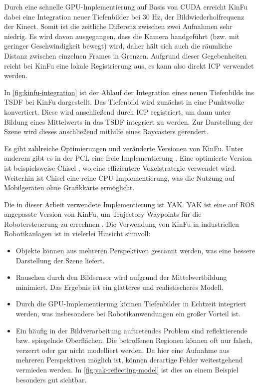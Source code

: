 Durch eine schnelle GPU-Implementierung auf Basis von CUDA erreicht \ac{KinFu} dabei eine Integration neuer Tiefenbilder bei 30 Hz, der Bildwiederholfrequenz der Kinect.
Somit ist die zeitliche Differenz zwischen zwei Aufnahmen sehr niedrig.
Es wird davon ausgegangen, dass die Kamera handgeführt (bzw. mit geringer Geschwindigkeit bewegt) wird, daher hält sich auch die räumliche Distanz zwischen einzelnen Frames in Grenzen.
Aufgrund dieser Gegebenheiten reicht bei \ac{KinFu} eine lokale Registrierung aus, es kann also direkt \ac{ICP} verwendet werden.

In \autoref{fig:kinfu-integration} ist der Ablauf der Integration eines neuen Tiefenbilds ins \ac{TSDF} bei \ac{KinFu} dargestellt.
Das Tiefenbild wird zunächst in eine Punktwolke konvertiert.
Diese wird anschließend durch \ac{ICP} registriert, um dann unter Bildung eines Mittelwerts in das \ac{TSDF} integriert zu werden.
Zur Darstellung der Szene wird dieses anschließend mithilfe eines Raycasters gerendert.


Es gibt zahlreiche Optimierungen und veränderte Versionen von \ac{KinFu}.
Unter anderem gibt es in der \ac{PCL} eine freie Implementierung \cite{pirovano2012kinfu}.
Eine optimierte Version ist beispielsweise Chisel \cite{klingensmith2015chisel}, wo eine effizientere Voxelstrategie verwendet wird.
Weiterhin ist Chisel eine reine CPU-Implementierung, was die Nutzung auf Mobilgeräten ohne Grafikkarte ermöglicht.

Die in dieser Arbeit verwendete Implementierung ist \ac{YAK}.
\ac{YAK} ist eine auf \ac{ROS} angepasste Version von \ac{KinFu}, um Trajectory Waypoints für die Robotersteuerung zu errechnen \cite{schornak2019yak}.
Die Verwendung von \ac{KinFu} in industriellen Robotikanlagen ist in vielerlei Hinsicht sinnvoll:
\begin{itemize}
\item Objekte können aus mehreren Perspektiven gescannt werden, was eine bessere Darstellung der Szene liefert.
\item Rauschen durch den Bildsensor wird aufgrund der Mittelwertbildung minimiert.
Das Ergebnis ist ein glatteres und realistischeres Modell.
\item Durch die GPU-Implementierung können Tiefenbilder in Echtzeit integriert werden, was insbesondere bei Robotikanwendungen ein großer Vorteil ist.
\item Ein häufig in der Bildverarbeitung auftretendes Problem sind reflektierende bzw. spiegelnde Oberflächen.
Die betroffenen Regionen können oft nur falsch, verzerrt oder gar nicht modelliert werden.
Da hier eine Aufnahme aus mehreren Perspektiven möglich ist, können derartige Fehler weitestgehend vermieden werden. In \autoref{fig:yak-reflecting-model} ist dies an einem Beispiel besonders gut sichtbar.
\end{itemize}


